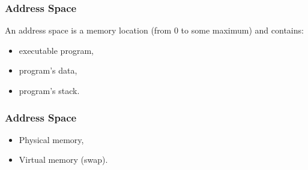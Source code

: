   \begin{frame}
    \frametitle{Address Space}
    An address space is a memory location (from 0 to some maximum) and contains:
      \begin{itemize}
        \item executable program,
        \item program's data,
        \item program's stack.
      \end{itemize}
  \end{frame}
  \begin{frame}
    \frametitle{Address Space}
      \begin{itemize}
        \item Physical memory,
        \item Virtual memory (swap).
      \end{itemize}
  \end{frame}



